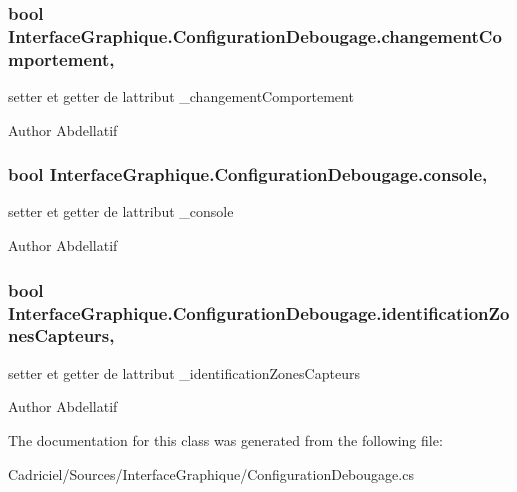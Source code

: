 \subsubsection[{\texorpdfstring{changement\+Comportement}{changementComportement}}]{\setlength{\rightskip}{0pt plus 5cm}bool Interface\+Graphique.\+Configuration\+Debougage.\+changement\+Comportement\hspace{0.3cm}{\ttfamily [get]}, {\ttfamily [set]}}\hypertarget{class_interface_graphique_1_1_configuration_debougage_a658c6e3c08fc26996b7e4a213050d13f}{}\label{class_interface_graphique_1_1_configuration_debougage_a658c6e3c08fc26996b7e4a213050d13f}
setter et getter de l\textquotesingle{}attribut \+\_\+changement\+Comportement \begin{DoxyAuthor}{Author}
Abdellatif 
\end{DoxyAuthor}
\subsubsection[{\texorpdfstring{console}{console}}]{\setlength{\rightskip}{0pt plus 5cm}bool Interface\+Graphique.\+Configuration\+Debougage.\+console\hspace{0.3cm}{\ttfamily [get]}, {\ttfamily [set]}}\hypertarget{class_interface_graphique_1_1_configuration_debougage_a04f2f5464086a4b97fc980e610478796}{}\label{class_interface_graphique_1_1_configuration_debougage_a04f2f5464086a4b97fc980e610478796}
setter et getter de l\textquotesingle{}attribut \+\_\+console \begin{DoxyAuthor}{Author}
Abdellatif 
\end{DoxyAuthor}
\subsubsection[{\texorpdfstring{identification\+Zones\+Capteurs}{identificationZonesCapteurs}}]{\setlength{\rightskip}{0pt plus 5cm}bool Interface\+Graphique.\+Configuration\+Debougage.\+identification\+Zones\+Capteurs\hspace{0.3cm}{\ttfamily [get]}, {\ttfamily [set]}}\hypertarget{class_interface_graphique_1_1_configuration_debougage_aad0771618af1abdaf4ef2fdc0a265403}{}\label{class_interface_graphique_1_1_configuration_debougage_aad0771618af1abdaf4ef2fdc0a265403}
setter et getter de l\textquotesingle{}attribut \+\_\+identification\+Zones\+Capteurs \begin{DoxyAuthor}{Author}
Abdellatif 
\end{DoxyAuthor}


The documentation for this class was generated from the following file\+:\begin{DoxyCompactItemize}
\item 
Cadriciel/\+Sources/\+Interface\+Graphique/Configuration\+Debougage.\+cs\end{DoxyCompactItemize}
